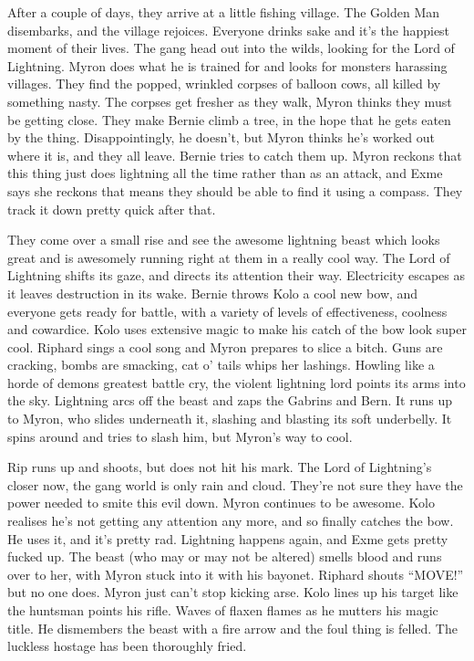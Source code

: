 After a couple of days, they arrive at a little fishing village. The Golden Man disembarks, and the village rejoices. Everyone drinks sake and it’s the happiest moment of their lives. The gang head out into the wilds, looking for the Lord of Lightning. Myron does what he is trained for and looks for monsters harassing villages. They find the popped, wrinkled corpses of balloon cows, all killed by something nasty. The corpses get fresher as they walk, Myron thinks they must be getting close. They make Bernie climb a tree, in the hope that he gets eaten by the thing. Disappointingly, he doesn’t, but Myron thinks he’s worked out where it is, and they all leave. Bernie tries to catch them up. Myron reckons that this thing just does lightning all the time rather than as an attack, and Exme says she reckons that means they should be able to find it using a compass. They track it down pretty quick after that.\medskip

They come over a small rise and see the awesome lightning beast which looks great and is awesomely running right at them in a really cool way. The Lord of Lightning shifts its gaze, and directs its attention their way. Electricity escapes as it leaves destruction in its wake. Bernie throws Kolo a cool new bow, and everyone gets ready for battle, with a variety of levels of effectiveness, coolness and cowardice. Kolo uses extensive magic to make his catch of the bow look super cool. Riphard sings a cool song and Myron prepares to slice a bitch. Guns are cracking, bombs are smacking, cat o' tails whips her lashings. Howling like a horde of demons greatest battle cry, the violent lightning lord points its arms into the sky. Lightning arcs off the beast and zaps the Gabrins and Bern. It runs up to Myron, who slides underneath it, slashing and blasting its soft underbelly. It spins around and tries to slash him, but Myron’s way to cool.\medskip

Rip runs up and shoots, but does not hit his mark. The Lord of Lightning's closer now, the gang world is only rain and cloud. They’re not sure they have the power needed to smite this evil down. Myron continues to be awesome. Kolo realises he’s not getting any attention any more, and so finally catches the bow. He uses it, and it’s pretty rad. Lightning happens again, and Exme gets pretty fucked up. The beast (who may or may not be altered) smells blood and runs over to her, with Myron stuck into it with his bayonet. Riphard shouts “MOVE!” but no one does. Myron just can’t stop kicking arse. Kolo lines up his target like the huntsman points his rifle. Waves of flaxen flames as he mutters his magic title. He dismembers the beast with a fire arrow and the foul thing is felled. The luckless hostage has been thoroughly fried.\medskip


